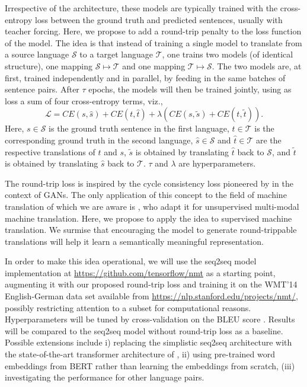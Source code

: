 \documentclass[11pt,a4paper]{article}
\begin{document}
Irrespective of the architecture, these models are typically trained with the cross-entropy loss between the ground truth and predicted sentences, usually with teacher forcing.
Here, we propose to add a round-trip penalty to the loss function of the model. The idea is that instead of training a single model to translate from a source language $\mathcal{S}$ to a target language $\mathcal{T}$, one trains two models (of identical structure), one mapping $\mathcal{S}\mapsto \mathcal{T}$ and one mapping $\mathcal{T}\mapsto \mathcal{S}$. The two models are, at first, trained independently and in parallel, by feeding in the same batches of sentence pairs. After $\tau$ epochs, the models will then be trained jointly, using as loss a sum of four cross-entropy terms, viz.,
\[
\mathcal{L} = CE(s, \hat{s}) + CE(t, \hat{t}) + \lambda \left( CE(s, \tilde{s}) + CE(t, \tilde{t})\right).
\]
Here, $s\in\mathcal{S}$ is the ground truth sentence in the first language, $t\in\mathcal{T}$ is the corresponding ground truth in the second language, $\hat{s}\in\mathcal{S}$ and $\hat{t}\in\mathcal{T}$ are the respective translations of $t$ and $s$, $\tilde{s}$ is obtained by translating $\hat{t}$ back to $\mathcal{S}$, and $\tilde{t}$ is obtained by translating $\hat{s}$ back to $\mathcal{T}$. $\tau$ and $\lambda$ are hyperparameters. 

The round-trip loss is inspired by the cycle consistency loss pioneered by \citet{CycleGAN2017} in the context of GANs. The only application of this concept to the field of machine translation of which we are aware is \citet{su:2018}, who adapt it for unsupervised multi-modal machine translation. Here, we propose to apply the idea to supervised machine translation. We surmise that encouraging the model to generate round-trippable translations will help it learn a semantically meaningful representation.

In order to make this idea operational, we will use the seq2seq model implementation at \href{https://github.com/tensorflow/nmt}{https://github.com/tensorflow/nmt} as a starting point, augmenting it with our proposed round-trip loss and training it on the  WMT'14 English-German data set available from \href{https://nlp.stanford.edu/projects/nmt/}{https://nlp.stanford.edu/projects/nmt/}, possibly restricting attention to a subset for computational reasons. Hyperparameters will be tuned by cross-validation on the BLEU score \citep{bleu}. Results will be compared to the seq2seq model without round-trip loss as a baseline. Possible extensions include i) replacing the simplistic seq2seq architecture with the state-of-the-art transformer architecture of \citet{transformer}, ii) using pre-trained word embeddings from BERT \citep{bert} rather than learning the embeddings from scratch, (iii) investigating the performance for other language pairs.

\end{document}
